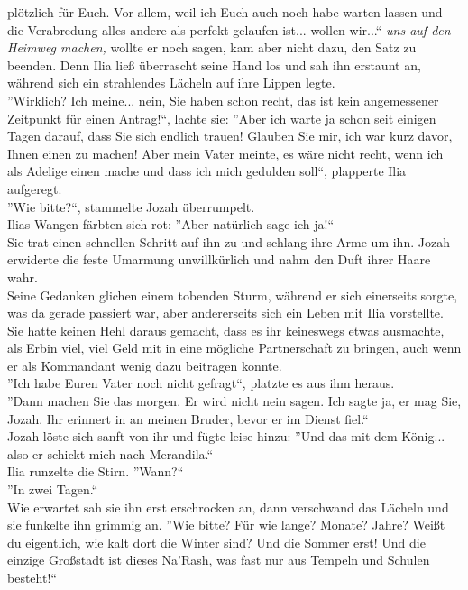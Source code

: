 plötzlich für Euch. Vor allem, weil ich Euch auch noch habe warten lassen und die Verabredung alles 
andere als perfekt gelaufen ist... wollen wir...`` \textit{uns auf den Heimweg machen,} wollte er 
noch sagen, kam aber nicht dazu, den Satz zu beenden. Denn Ilia ließ überrascht seine Hand los und 
sah ihn erstaunt an, während sich ein strahlendes Lächeln auf ihre Lippen legte.\\
''Wirklich? Ich meine... nein, Sie haben schon recht, das ist kein angemessener Zeitpunkt für einen 
Antrag!``, lachte sie: ''Aber ich warte ja schon seit einigen Tagen darauf, dass Sie sich endlich 
trauen! Glauben Sie mir, ich war kurz davor, Ihnen einen zu machen! Aber mein Vater meinte, es wäre 
nicht recht, wenn ich als Adelige einen mache und dass ich mich gedulden soll``, plapperte Ilia 
aufgeregt.\\
''Wie bitte?``, stammelte Jozah überrumpelt.\\
Ilias Wangen färbten sich rot: ''Aber natürlich sage ich ja!``\\
Sie trat einen schnellen Schritt auf ihn zu und schlang ihre Arme um ihn. Jozah erwiderte die feste 
Umarmung unwillkürlich und nahm den Duft ihrer Haare wahr.\\
Seine Gedanken glichen einem tobenden Sturm, während er sich einerseits sorgte, was da gerade 
passiert war, aber andererseits sich ein Leben mit Ilia vorstellte. Sie hatte keinen Hehl daraus 
gemacht, dass es ihr keineswegs etwas ausmachte, als Erbin viel, viel Geld mit in eine mögliche 
Partnerschaft zu bringen, auch wenn er als Kommandant wenig dazu beitragen konnte.\\
''Ich habe Euren Vater noch nicht gefragt``, platzte es aus ihm heraus.\\
''Dann machen Sie das morgen. Er wird nicht nein sagen. Ich sagte ja, er mag Sie, Jozah. Ihr 
erinnert in an meinen Bruder, bevor er im Dienst fiel.``\\
Jozah löste sich sanft von ihr und fügte leise hinzu: ''Und das mit dem König... also er schickt 
mich nach Merandila.``\\
Ilia runzelte die Stirn. ''Wann?``\\
''In zwei Tagen.``\\
Wie erwartet sah sie ihn erst erschrocken an, dann verschwand das Lächeln und sie funkelte ihn 
grimmig an. ''Wie bitte? Für wie lange? Monate? Jahre? Weißt du eigentlich, wie kalt dort die 
Winter sind? Und die Sommer erst! Und die einzige Großstadt ist dieses Na'Rash, was fast nur aus 
Tempeln und Schulen besteht!``\\
